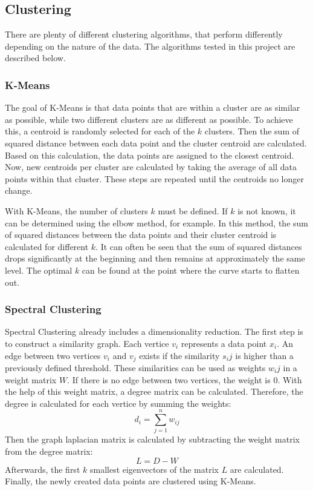 \subsection{Clustering}
There are plenty of different clustering algorithms, that perform differently depending on the nature of the data.
The algorithms tested in this project are described below.

\subsubsection{K-Means}
The goal of K-Means is that data points that are within a cluster are as similar as possible, while two different clusters are as different as possible.
To achieve this, a centroid is randomly selected for each of the $k$ clusters.
Then the sum of squared distance between each data point and the cluster centroid are calculated.
Based on this calculation, the data points are assigned to the closest centroid.
Now, new centroids per cluster are calculated by taking the average of all data points within that cluster.
These steps are repeated until the centroids no longer change.\cite{kmeans}

With K-Means, the number of clusters $k$ must be defined. If $k$ is not known, it can be determined using the elbow method, for example.
In this method, the sum of squared distances between the data points and their cluster centroid is calculated for different $k$.
It can often be seen that the sum of squared distances drops significantly at the beginning and then remains at approximately the same level.
The optimal $k$ can be found at the point where the curve starts to flatten out.\cite{kmeans}

\subsubsection{Spectral Clustering}
Spectral Clustering already includes a dimensionality reduction.
The first step is to construct a similarity graph.
Each vertice $v_i$ represents a data point $x_i$.
An edge between two vertices $v_i$ and $v_j$ exists if the similarity $s_ij$ is higher than a previously defined threshold.
These similarities can be used as weights $w_ij$ in a weight matrix $W$.
If there is no edge between two vertices, the weight is $0$.
With the help of this weight matrix, a degree matrix can be calculated.
Therefore, the degree is calculated for each vertice by summing the weights:
$$
d_i = \sum_{j=1}^n{w_{ij}}
$$
Then the graph laplacian matrix is calculated by subtracting the weight matrix from the degree matrix:
$$
L = D - W
$$
Afterwards, the first $k$ smallest eigenvectors of the matrix $L$ are calculated.
Finally, the newly created data points are clustered using K-Means.\cite{spectral_clustering}

